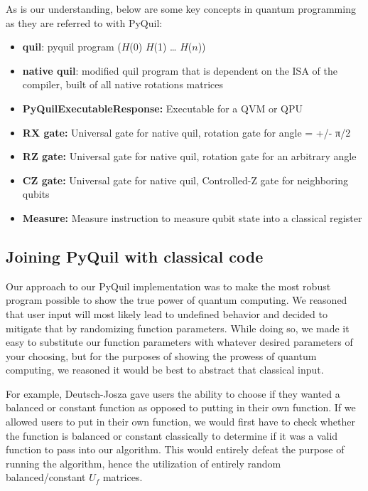 \documentclass[12pt]{article}
\begin{document}
As is our understanding, below are some key concepts in quantum programming as they are referred to with PyQuil:
\begin{itemize}
    \item \textbf{quil}: pyquil program ($H$(0) $H$(1) … $H$($n$))
    \item \textbf{native quil}: modified quil program that is dependent on the ISA of the compiler, built of all native rotations matrices
    \item \textbf{PyQuilExecutableResponse:} Executable for a QVM or QPU
    \item \textbf{RX gate:} Universal gate for native quil, rotation gate for angle = +/- π/2
    \item \textbf{RZ gate:} Universal gate for native quil, rotation gate for an arbitrary angle
    \item \textbf{CZ gate:} Universal gate for native quil, Controlled-Z gate for neighboring qubits
    \item \textbf{Measure:} Measure instruction to measure qubit state into a classical register
\end{itemize}

\subsection{Joining PyQuil with classical code}

Our approach to our PyQuil implementation was to make the most robust program possible to show the true power of quantum computing.
We reasoned that user input will most likely lead to undefined behavior and decided to mitigate that by randomizing function parameters.
While doing so, we made it easy to substitute our function parameters with whatever desired parameters of your choosing, but for the purposes of showing the prowess of quantum computing, we reasoned it would be best to abstract that classical input.

For example, Deutsch-Josza gave users the ability to choose if they wanted a balanced or constant function as opposed to putting in their own function.
If we allowed users to put in their own function, we would first have to check whether the function is balanced or constant classically to determine if it was a valid function to pass into our algorithm.
This would entirely defeat the purpose of running the algorithm, hence the utilization of entirely random balanced/constant $U_f$ matrices.
\end{document}
